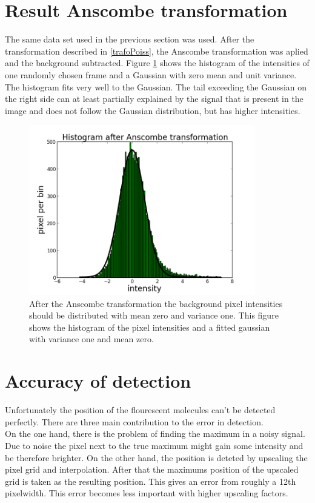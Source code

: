\section{Result Anscombe transformation}
The same data set used in the previous section was used. After the transformation described in \ref{trafoPoiss}, the Anscombe transformation was aplied and the background subtracted. Figure \ref{isitAnscombe} shows the histogram of the intensities of one randomly chosen frame and a Gaussian with zero mean and unit variance. The histogram fits very well to the Gaussian. The tail exceeding the Gaussian on the right side can at least partially explained by the signal that is present in the image and does not follow the Gaussian distribution, but has higher intensities.
\begin{figure}
\centering
\includegraphics[width = 0.88\textwidth]{pictures/anscombeAndFit.png}
	 \caption{After the Anscombe transformation the background pixel intensities should be distributed with mean zero and variance one. This figure shows the histogram of the pixel intensities and a fitted gaussian with variance one and mean zero.}
	\label{isitAnscombe}
\end{figure}

\section{Accuracy of detection}
Unfortunately the position of the flourescent molecules can't be detected
perfectly. There are three main contribution to the error in detection.\\
On the one hand, there is the problem of finding the maximum in a noisy signal. Due to
noise the pixel next to the true maximum might gain some intensity and be
therefore brighter.\newline
On the other hand, the position is deteted by upscaling the pixel grid and interpolation.
After that the maximums position of the upscaled grid is taken as the resulting
position. This gives an error from roughly a 12th pixelwidth. This error becomes less important with higher upscaling factors.\newline

